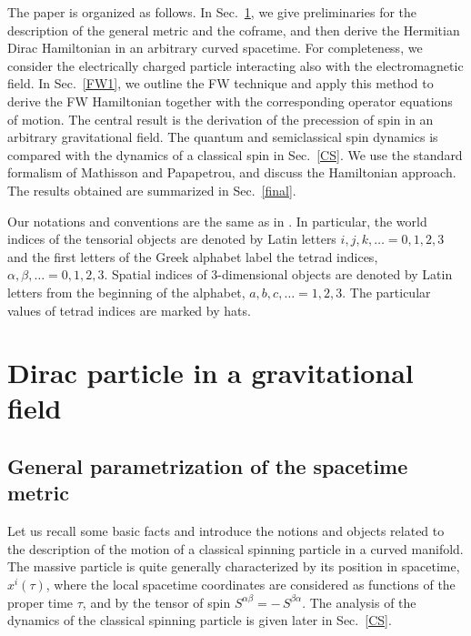 \documentclass[preprint,showpacs,preprintnumbers,eqsecnum,amsmath,amssymb]{revtex4-1}
\begin{document}
The paper is organized as follows. In Sec.~\ref{Hamiltonian}, we give preliminaries
for the description of the general metric and the coframe, and then derive the
Hermitian Dirac Hamiltonian in an arbitrary curved spacetime.
For completeness, we consider the electrically charged particle interacting also with the
electromagnetic field. In Sec.~\ref{FW1}, we outline the FW technique
and apply this method to derive the FW Hamiltonian together with the corresponding
operator equations of motion. The central result is the derivation of the precession
of spin in an arbitrary gravitational field.
The quantum and semiclassical spin dynamics is compared with
the dynamics of a classical spin in Sec.~\ref{CS}. We use the standard formalism
of Mathisson and Papapetrou, and discuss the Hamiltonian approach. The results
obtained are summarized in Sec.~\ref{final}.

Our notations and conventions are the same as in \cite{PRD2}. In particular, the
world indices of the tensorial objects are denoted by Latin letters $i,j,k,\ldots
= 0,1,2,3$ and the first letters of the Greek alphabet label the tetrad indices,
$\alpha,\beta,\ldots = 0,1,2,3$. Spatial indices of 3-dimensional objects are denoted
by Latin letters from the beginning of the alphabet, $a,b,c,\ldots = 1,2,3$. The 
particular values of tetrad indices are marked by hats.

\section{Dirac particle in a gravitational field}\label{Hamiltonian}

\subsection{General parametrization of the spacetime metric}


Let us recall some basic facts and introduce the notions and objects related to the
description of the motion of a classical spinning particle in a curved manifold. The
massive particle is quite generally characterized by its position in spacetime,
$x^i(\tau)$, where the local spacetime coordinates are considered as functions of
the proper time $\tau$, and by the tensor of spin $S^{\alpha\beta} = -\,S^{\beta\alpha}$.
The analysis of the dynamics of the classical spinning particle is given later in
Sec.~\ref{CS}.
\end{document}
